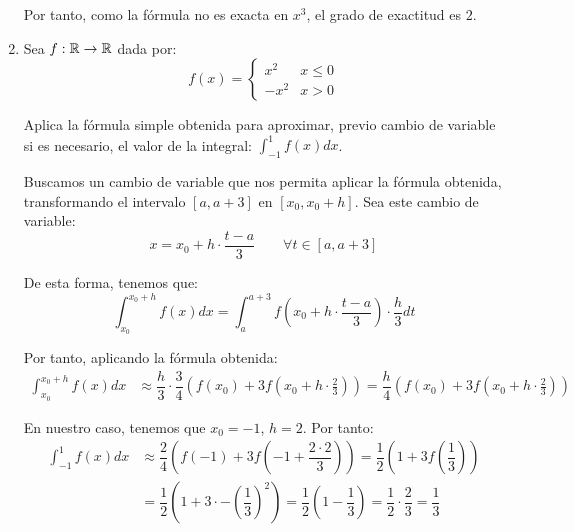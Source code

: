 \begin{ejercicio}
\begin{enumerate}
        Por tanto, como la fórmula no es exacta en $x^3$, el grado de exactitud es $2$.

        \item Sea $f:\mathbb{R}\to \mathbb{R}$ dada por:
        \begin{equation*}
            f(x) = \begin{cases}
                x^2 & x\leq 0 \\
                -x^2 & x > 0
            \end{cases}
        \end{equation*}

        Aplica la fórmula simple obtenida para aproximar, previo cambio de variable si es necesario, el valor de la integral: $\int_{-1}^{1} f(x)dx$.

        Buscamos un cambio de variable que nos permita aplicar la fórmula obtenida, transformando el intervalo $[a,a+3]$ en $[x_0,x_0+h]$.
        Sea este cambio de variable:
        \begin{equation*}
            x = x_0 + h\cdot \frac{t-a}{3}\qquad \forall t\in [a,a+3]
        \end{equation*}

        De esta forma, tenemos que:
        \begin{equation*}
            \int_{x_0}^{x_0+h} f(x)dx = \int_{a}^{a+3} f\left(x_0 + h\cdot \frac{t-a}{3}\right)\cdot \frac{h}{3}dt
        \end{equation*}

        Por tanto, aplicando la fórmula obtenida:
        \begin{align*}
            \int_{x_0}^{x_0+h} f(x)dx &\approx \dfrac{h}{3}\cdot \dfrac{3}{4}\left(f(x_0) + 3f\left(x_0 + h\cdot \frac{2}{3}\right)\right)
            = \dfrac{h}{4}\left(f(x_0) + 3f\left(x_0 + h\cdot \frac{2}{3}\right)\right)
        \end{align*}

        En nuestro caso, tenemos que $x_0 = -1$, $h = 2$. Por tanto:
        \begin{align*}
            \int_{-1}^{1} f(x)dx &\approx \dfrac{2}{4}\left(f(-1) + 3f\left(-1+\dfrac{2\cdot 2}{3}\right)\right)
            = \dfrac{1}{2}\left(1+3f\left(\dfrac{1}{3}\right)\right)\\
            &= \dfrac{1}{2}\left(1 + 3\cdot -\left(\dfrac{1}{3}\right)^2\right) = \dfrac{1}{2}\left(1 - \dfrac{1}{3}\right) = \dfrac{1}{2}\cdot \dfrac{2}{3} = \dfrac{1}{3}
        \end{align*}


\end{enumerate}
\end{ejercicio}
